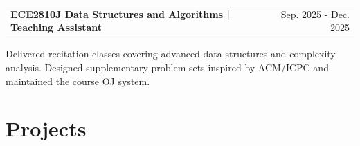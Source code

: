 \documentclass[a4paper,12pt]{article}
\makeatletter
\newenvironment{jobshort}[2]
    {
    \begin{tabularx}{\linewidth}{@{}l X r@{}}
    \textbf{#1} & \hfill &  #2 \\[3.75pt]
    \end{tabularx}
    }
    {
    }
\makeatother
\begin{document}
\begin{jobshort}{ECE2810J Data Structures and Algorithms | Teaching Assistant}{Sep. 2025 - Dec. 2025}
Delivered recitation classes covering advanced data structures and complexity analysis. 
Designed supplementary problem sets inspired by ACM/ICPC and maintained the course OJ system.
\end{jobshort}



\section{Projects}
\end{document}
